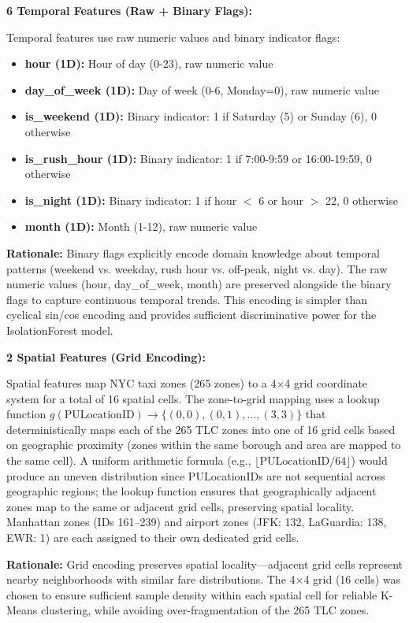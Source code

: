 \textbf{6 Temporal Features (Raw + Binary Flags):}

Temporal features use raw numeric values and binary indicator flags:

\begin{itemize}
    \item \textbf{hour (1D):} Hour of day (0-23), raw numeric value
    \item \textbf{day\_of\_week (1D):} Day of week (0-6, Monday=0), raw numeric value
    \item \textbf{is\_weekend (1D):} Binary indicator: 1 if Saturday (5) or Sunday (6), 0 otherwise
    \item \textbf{is\_rush\_hour (1D):} Binary indicator: 1 if 7:00-9:59 or 16:00-19:59, 0 otherwise
    \item \textbf{is\_night (1D):} Binary indicator: 1 if hour $<$ 6 or hour $>$ 22, 0 otherwise
    \item \textbf{month (1D):} Month (1-12), raw numeric value
\end{itemize}

\textbf{Rationale:} Binary flags explicitly encode domain knowledge about temporal patterns (weekend vs. weekday, rush hour vs. off-peak, night vs. day). The raw numeric values (hour, day\_of\_week, month) are preserved alongside the binary flags to capture continuous temporal trends. This encoding is simpler than cyclical sin/cos encoding and provides sufficient discriminative power for the IsolationForest model.

\textbf{2 Spatial Features (Grid Encoding):}

Spatial features map NYC taxi zones (265 zones) to a 4$\times$4 grid coordinate system for a total of 16 spatial cells. The zone-to-grid mapping uses a lookup function $g(\text{PULocationID}) \to \{(0,0), (0,1), \ldots, (3,3)\}$ that deterministically maps each of the 265 TLC zones into one of 16 grid cells based on geographic proximity (zones within the same borough and area are mapped to the same cell). A uniform arithmetic formula (e.g., $\lfloor \text{PULocationID}/64 \rfloor$) would produce an uneven distribution since PULocationIDs are not sequential across geographic regions; the lookup function ensures that geographically adjacent zones map to the same or adjacent grid cells, preserving spatial locality. Manhattan zones (IDs 161--239) and airport zones (JFK: 132, LaGuardia: 138, EWR: 1) are each assigned to their own dedicated grid cells.

\textbf{Rationale:} Grid encoding preserves spatial locality---adjacent grid cells represent nearby neighborhoods with similar fare distributions. The 4$\times$4 grid (16 cells) was chosen to ensure sufficient sample density within each spatial cell for reliable K-Means clustering, while avoiding over-fragmentation of the 265 TLC zones.

